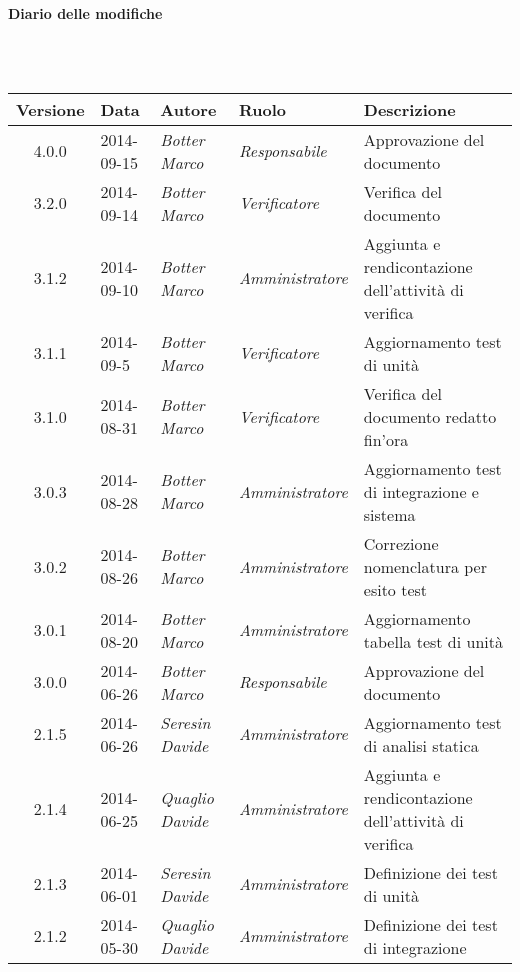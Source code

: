 \noindent\begin{Large}\textbf{Diario delle modifiche}\end{Large}\\
\\
\begin{small}
\begin{tabular}{|c|p{1.8cm}|p{2.8cm}|p{2.8cm}|p{3.5cm}|}
\hline
Versione & Data & Autore & Ruolo & Descrizione \\
\hline
\hline
4.0.0 & 2014-09-15 & 
\textit{Botter Marco} &
\textit{Responsabile} &  Approvazione del documento\\
\hline
3.2.0 & 2014-09-14 & 
\textit{Botter Marco} &
\textit{Verificatore} &  Verifica del documento\\
\hline
3.1.2 & 2014-09-10 & 
\textit{Botter Marco} &
\textit{Amministratore} &  Aggiunta e rendicontazione dell'attività di verifica\\
\hline
3.1.1 & 2014-09-5 & 
\textit{Botter Marco} &
\textit{Verificatore} &  Aggiornamento test di unità\\
\hline
3.1.0 & 2014-08-31 & 
\textit{Botter Marco} &
\textit{Verificatore} &  Verifica del documento redatto fin'ora\\
\hline
3.0.3 & 2014-08-28 & 
\textit{Botter Marco} &
\textit{Amministratore} &  Aggiornamento test di integrazione e sistema\\
\hline
3.0.2 & 2014-08-26 & 
\textit{Botter Marco} &
\textit{Amministratore} &  Correzione nomenclatura per esito test\\
\hline
3.0.1 & 2014-08-20 & 
\textit{Botter Marco} &
\textit{Amministratore} &  Aggiornamento tabella test di unità\\
\hline
3.0.0 & 2014-06-26 & 
\textit{Botter Marco} &
\textit{Responsabile} &  Approvazione del documento\\
\hline
2.1.5 & 2014-06-26 & 
\textit{Seresin Davide} &
\textit{Amministratore} &  Aggiornamento test di analisi statica\\
\hline
2.1.4 & 2014-06-25 & 
\textit{Quaglio Davide} &
\textit{Amministratore} &  Aggiunta e rendicontazione dell'attività di verifica\\
\hline
2.1.3 & 2014-06-01 & 
\textit{Seresin Davide} &
\textit{Amministratore} &  Definizione dei test di unità\\
\hline
2.1.2 & 2014-05-30 & 
\textit{Quaglio Davide} &
\textit{Amministratore} &  Definizione dei test di integrazione\\

\end{tabular}
\end{small}
